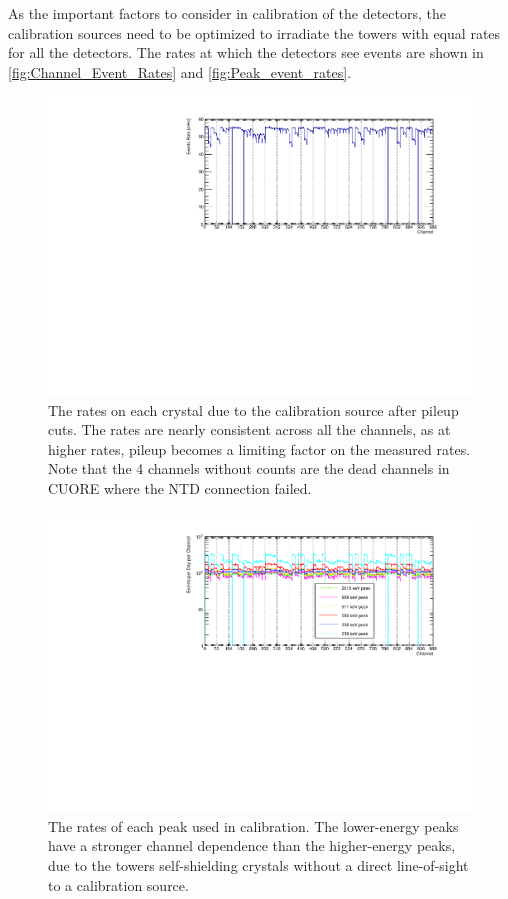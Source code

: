 As the important factors to consider in calibration of the detectors, the calibration sources need to be optimized to irradiate the towers with equal rates for all the detectors.
The rates at which the detectors see events are shown in \autoref{fig:Channel_Event_Rates} and \autoref{fig:Peak_event_rates}.
\begin{figure}
    \centering
    \includegraphics[width=0.9\linewidth]{Figures/ChannelEventRates.pdf}
    \caption[The rates on each crystal due to the calibration source after pileup cuts.]
    {The rates on each crystal due to the calibration source after pileup cuts.
    The rates are nearly consistent across all the channels, as at higher rates, pileup becomes a limiting factor on the measured rates.
    Note that the 4 channels without counts are the dead channels in CUORE where the NTD connection failed.}
    \label{fig:Channel_Event_Rates}
\end{figure}
\begin{figure}
    \centering
    \includegraphics[width=0.9\linewidth]{Figures/PeakEventRates.pdf}
    \caption[The rates of each peak used in calibration.]
    {The rates of each peak used in calibration.
    The lower-energy peaks have a stronger channel dependence than the higher-energy peaks, due to the towers self-shielding crystals without a direct line-of-sight to a calibration source.}
    \label{fig:Peak_event_rates}
\end{figure}
